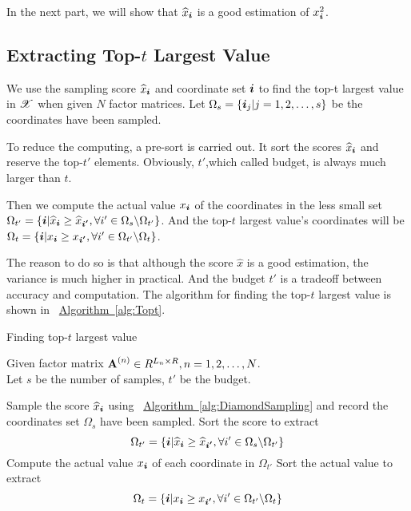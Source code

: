 \documentclass[letterpaper]{article}
\newcommand{\T}[1]{\boldsymbol{\mathscr{\MakeUppercase{#1}}}}
\newcommand{\V}[1]{{\bm{{\MakeLowercase{#1}}}}}
\newcommand{\M}[1]{{\bm{\mathbf{\MakeUppercase{#1}}}}}
\newcommand{\Alg}[1] {\hyperref[alg:#1] {Algorithm~\ref*{alg:#1}}}
\begin{document}
In the next part, we will show that $\widehat{x}_{\V{i}}$ is a good estimation of $x_{\V{i}}^2$.

\subsection{Extracting Top-$t$ Largest Value}

We use the sampling score $\widehat{x}_{\V{i}}$ and coordinate set $\V{i}$ to find the top-t largest value in $\T{X}$ when given $N$ factor matrices. Let $\Omega_s = \{\V{i}_j|j = 1,2,\ldots,s\}$ be the coordinates have been sampled.

To reduce the computing, a pre-sort is carried out. It sort the scores $\widehat{x}_{\V{i}}$ and reserve the top-$t'$ elements. Obviously, $t'$,which called budget, is always much larger than $t$.

Then we compute the actual value $x_{\V{i}}$ of the coordinates in the less small set $\Omega_{t'} = \{\V{i}|\widehat{x}_{\V{i}}\geq \widehat{x}_{\V{i'}},\forall i'\in \Omega_{s} \backslash \Omega_{t'}\}$. And the top-$t$ largest value's coordinates will be $\Omega_{t}=\{\V{i}|x_{\V{i}}\geq x_{\V{i'}},\forall i' \in \Omega_{t'} \backslash \Omega_{t} \}$.

The reason to do so is that although the score $\widehat{x}$ is a good estimation, the variance is much higher in practical. And the budget $t'$ is a tradeoff between accuracy and computation. The algorithm for finding the top-$t$ largest value is shown in ~\Alg{Topt}.
\begin{algorithm}[t]
    \caption{Finding top-$t$ largest value}
    \label{alg:Topt}
    Given factor matrix $\M{A}^{(n)}\in R^{L_n\times R}, n = 1,2,\ldots,N$.\\
    Let $s$ be the number of samples, $t'$ be the budget.
    \begin{algorithmic}[1]
    \State Sample the score $\widehat{x}_\V{i}$ using ~\Alg{DiamondSampling} and record the coordinates set $\Omega_s$ have been sampled.
    \State Sort the score to extract
    \[
        \Omega_{t'} = \{\V{i}|\widehat{x}_{\V{i}}\geq \widehat{x}_{\V{i'}},\forall i'\in \Omega_{s} \backslash \Omega_{t'}\}
    \]
    \State Compute the actual value $x_{\V{i}}$ of each coordinate in $\Omega_{t'}$
    \State Sort the actual value to extract
    \[
        \Omega_{t}=\{\V{i}|x_{\V{i}}\geq x_{\V{i'}},\forall i' \in \Omega_{t'} \backslash \Omega_{t} \}
    \]
    \end{algorithmic}
\end{algorithm}
\end{document}
